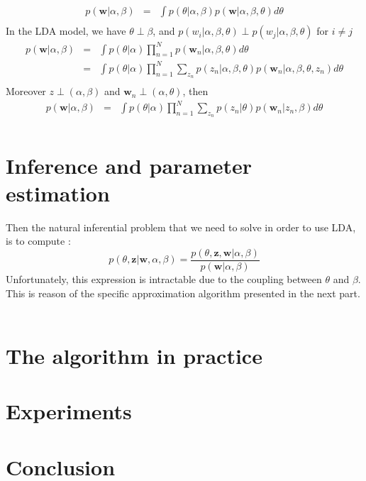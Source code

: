 \documentclass[12pt]{article}
\begin{document}
\begin{eqnarray*}
p(\textbf{w}|\alpha, \beta) &  = & \int p(\theta | \alpha, \beta)p(\textbf{w} | \alpha, \beta, \theta)d\theta\\
\end{eqnarray*}
In the LDA model, we have $ \theta \perp \beta$, and $p(w_{i} | \alpha, \beta, \theta) \perp p(w_{j} | \alpha, \beta, \theta)$  for $ i \neq j $
\begin{eqnarray*}
p(\textbf{w}|\alpha, \beta) & = & \int p(\theta | \alpha) \prod_{n=1}^{N} p(\textbf{w}_{n} | \alpha, \beta, \theta)d\theta\\
& = & \int  p(\theta |\alpha) \prod_{n=1}^{N}  \sum_{z_{n}}p(z_{n}|\alpha, \beta, \theta)p(\textbf{w}_{n} | \alpha, \beta, \theta, z_{n}) d\theta\\
\end{eqnarray*}
Moreover $z \perp (\alpha,\beta)$ and $\textbf{w}_{n} \perp (\alpha,\theta)$, then
\begin{eqnarray*}
p(\textbf{w}|\alpha, \beta) & = & \int p(\theta | \alpha)  \prod_{n=1}^{N}  \sum_{z_{n}}p(z_{n} |\theta)p(\textbf{w}_{n} | z_{n}, \beta) d\theta\\
\end{eqnarray*}

\section{Inference and parameter estimation}
Then the natural inferential problem that we need to solve in order to use LDA, is to compute :
$$p(\theta, \textbf{z}|\textbf{w},\alpha,\beta)=\frac{p(\theta,\textbf{z},\textbf{w}|\alpha,\beta)}{p(\textbf{w}|\alpha,\beta)}$$
Unfortunately, this expression is intractable due to the coupling between $\theta$ and $\beta$.
This is reason of the specific approximation algorithm presented in the next part. ~\\

\section{The algorithm in practice}

\section{Experiments}

\section*{Conclusion}
\end{document}
